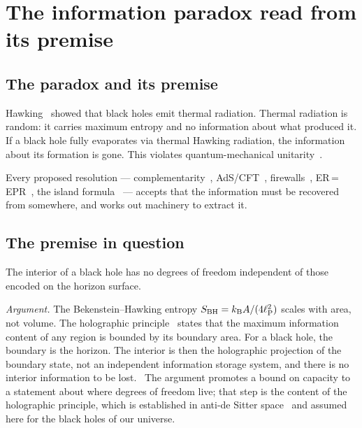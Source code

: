 \section{The information paradox read from its premise}\label{sec:bi_paradox}
\subsection{The paradox and its premise}
Hawking~\cite{Hawking1975} showed that black holes emit thermal radiation. Thermal radiation is random: it carries maximum entropy and no information about what produced
it. If a black hole fully evaporates via thermal Hawking radiation, the information about its formation is gone. This violates quantum-mechanical
unitarity~\cite{Hawking1976}.

Every proposed resolution --- complemen\-tarity~\cite{SusskindThorlaciusUglum1993}, AdS/CFT~\cite{Maldacena1998}, firewalls~\cite{AMPS2013}, ER\,=\,EPR~\cite{MaldacenaSusskind2013}, the island
formula~\cite{Penington2020,Almheiri2020} --- accepts that the information must be recovered from somewhere, and works out machinery to extract it. \interp

\subsection{The premise in question}
\begin{keybox}[title={Proposition (no interior degrees of freedom) --- conjecture}]
The interior of a black hole has no degrees of freedom independent of those encoded on the horizon surface.
\end{keybox}
\emph{Argument.} The Bekenstein--Hawking entropy $S_{\rm BH}=k_{\mathrm B} A/(4\ell_{\mathrm P}^2)$ scales with area, not volume. The holographic principle~\cite{tHooft1993} states that the maximum
information content of any region is bounded by its boundary area. For a black hole, the boundary is the horizon. The interior is then the holographic
projection of the boundary state, not an independent information storage system, and there is no interior information to be lost. \conjecture\ The
argument promotes a bound on capacity to a statement about where degrees of freedom live; that step is the content of the holographic principle, which
is established in anti-de Sitter space~\cite{Maldacena1998} and assumed here for the black holes of our universe.

